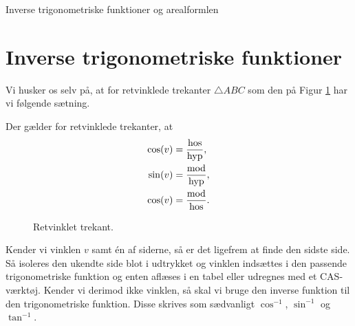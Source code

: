 \begin{center}
\Huge
	Inverse trigonometriske funktioner og arealformlen		
\end{center}

\section*{Inverse trigonometriske funktioner}

Vi husker os selv på, at for retvinklede trekanter $\triangle ABC$ som den på Figur \ref{fig:retvinklet}
har vi følgende sætning.
\begin{setn}
	Der gælder for retvinklede trekanter, at
	\begin{align*}
		\cos(v) &= \frac{\textnormal{hos}}{\textnormal{hyp}}, \\
		\sin(v) &= \frac{\textnormal{mod}}{\textnormal{hyp}}, \\
		\cos(v) &= \frac{\textnormal{mod}}{\textnormal{hos}}.
	\end{align*}
\end{setn}

\begin{figure}[H]
	\centering
	\caption{Retvinklet trekant.}
	\label{fig:retvinklet}
\end{figure}

Kender vi vinklen $v$ samt én af siderne, så er det ligefrem at finde den sidste side. Så isoleres den ukendte side blot i udtrykket og vinklen indsættes i den passende trigonometriske funktion og enten aflæses i en tabel eller udregnes med et CAS-værktøj. Kender vi derimod ikke vinklen, så skal vi bruge den inverse funktion til den trigonometriske funktion. Disse skrives som sædvanligt $\cos^{-1}$, $\sin^{-1}$ og  $\tan^{-1}$.

